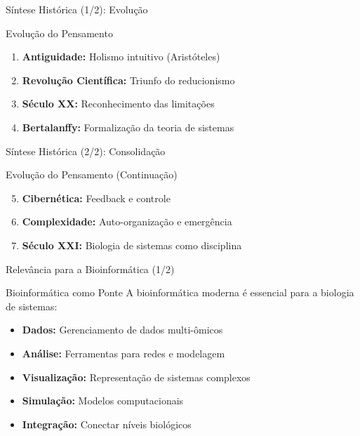 \begin{frame}{Síntese Histórica (1/2): Evolução}
\begin{block}{Evolução do Pensamento}
\begin{enumerate}
    \item \textbf{Antiguidade:} Holismo intuitivo (Aristóteles)
    \item \textbf{Revolução Científica:} Triunfo do reducionismo
    \item \textbf{Século XX:} Reconhecimento das limitações
    \item \textbf{Bertalanffy:} Formalização da teoria de sistemas
\end{enumerate}
\end{block}
\end{frame}

\begin{frame}{Síntese Histórica (2/2): Consolidação}
\begin{block}{Evolução do Pensamento (Continuação)}
\begin{enumerate}
    \setcounter{enumi}{4}
    \item \textbf{Cibernética:} Feedback e controle
    \item \textbf{Complexidade:} Auto-organização e emergência
    \item \textbf{Século XXI:} Biologia de sistemas como disciplina
\end{enumerate}
\end{block}

\vspace{0.3cm}

\end{frame}

\begin{frame}{Relevância para a Bioinformática (1/2)}
\begin{block}{Bioinformática como Ponte}
A bioinformática moderna é essencial para a biologia de sistemas:

\vspace{0.3cm}
\begin{itemize}
    \item \textbf{Dados:} Gerenciamento de dados multi-ômicos
    \item \textbf{Análise:} Ferramentas para redes e modelagem
    \item \textbf{Visualização:} Representação de sistemas complexos
    \item \textbf{Simulação:} Modelos computacionais
    \item \textbf{Integração:} Conectar níveis biológicos
\end{itemize}
\end{block}
\end{frame}

